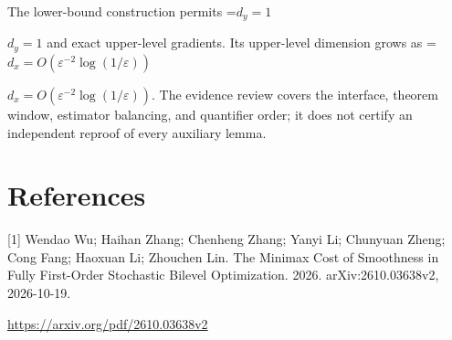 \documentclass[10pt,a4paper]{article}
\newcommand{\AtlasMath}[1]{\par\begingroup\centering\setbox0=\hbox{$\displaystyle #1$}\ifdim\wd0>1.4\linewidth\typeout{ATLAS WIDE FORMULA: \the\wd0}\fi\ifdim\wd0>\linewidth\resizebox{\linewidth}{!}{\box0}\else\box0\fi\par\endgroup}
\newcommand{\AtlasInlineMath}[1]{\begingroup\setbox0=\hbox{$#1$}\ifdim\wd0>.4\linewidth\endgroup\AtlasMath{#1}\else\endgroup$#1$\fi}
\begin{document}
The lower-bound construction permits \AtlasInlineMath{d_y=1} and exact upper-level gradients. Its upper-level dimension grows as \AtlasInlineMath{d_x=O(\varepsilon^{-2}\log(1/\varepsilon))}. The evidence review covers the interface, theorem window, estimator balancing, and quantifier order; it does not certify an independent reproof of every auxiliary lemma.

\section{References}
[1] Wendao Wu; Haihan Zhang; Chenheng Zhang; Yanyi Li; Chunyuan Zheng; Cong Fang; Haoxuan Li; Zhouchen Lin. The Minimax Cost of Smoothness in Fully First-Order Stochastic Bilevel Optimization. 2026. arXiv:2610.03638v2, 2026-10-19.

\url{https://arxiv.org/pdf/2610.03638v2}
\end{document}
